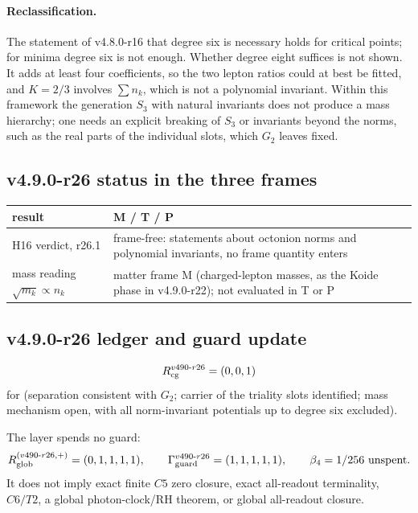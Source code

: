 \paragraph{Reclassification.}
The statement of v4.8.0-r16 that degree six is necessary holds for critical points; for minima degree six is not enough.
Whether degree eight suffices is not shown.  It adds at least four coefficients, so the two lepton ratios could at best be
fitted, and \(K=2/3\) involves \(\sum n_k\), which is not a polynomial invariant.  Within this framework the generation
\(S_3\) with natural invariants does not produce a mass hierarchy; one needs an explicit breaking of \(S_3\) or invariants
beyond the norms, such as the real parts of the individual slots, which \(G_2\) leaves fixed.

\subsection*{v4.9.0-r26 status in the three frames}
\label{subsec:v490-r26-frames}

\begin{center}
\small
\begin{tabular}{@{}>{\raggedright\arraybackslash}p{}>{\raggedright\arraybackslash}p{}@{}}
\toprule
result & M / T / P\\
\midrule
H16 verdict, r26.1 & frame-free: statements about octonion norms and polynomial invariants, no frame quantity enters\\
mass reading \(\sqrt{m_k}\propto n_k\) & matter frame M (charged-lepton masses, as the Koide phase in v4.9.0-r22); not evaluated in T or P\\
\bottomrule
\end{tabular}
\end{center}

\subsection*{v4.9.0-r26 ledger and guard update}
\label{subsec:v490-r26-ledger-guard}

\[
R_{\rm cg}^{v490\text{-}r26}=(0,0,1)
\]
for (separation consistent with \(G_2\); carrier of the triality slots identified; mass mechanism open, with all
norm-invariant potentials up to degree six excluded).

The layer spends no guard:
\[
R_{\rm glob}^{(v490\text{-}r26,+)}=(0,1,1,1,1),
\qquad
\Gamma_{\rm guard}^{v490\text{-}r26}=(1,1,1,1,1),
\qquad
\beta_4=1/256\ \text{unspent}.
\]
It does not imply exact finite \(C5\) zero closure, exact all-readout terminality,
\(C6/T2\), a global photon-clock/RH theorem, or global all-readout closure.
